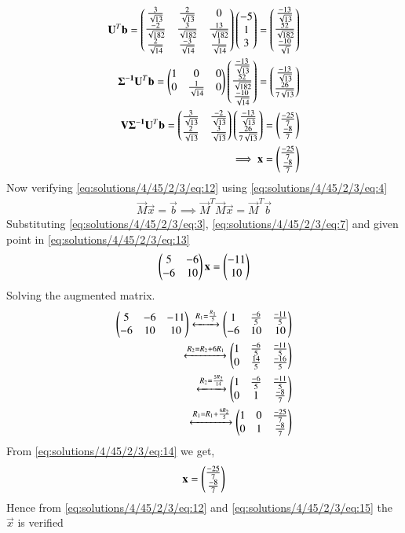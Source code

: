 \begin{align}
\mathbf{U}^T\mathbf{b}=\begin{pmatrix}\frac{3}{\sqrt{13}}&\frac{2}{\sqrt{13}}&0\\\frac{-2}{\sqrt{182}}&\frac{3}{\sqrt{182}}&\frac{13}{\sqrt{182}}\\\frac{2}{\sqrt{14}}&\frac{-3}{\sqrt{14}}&\frac{1}{\sqrt{14}}\end{pmatrix}\begin{pmatrix}-5\\1\\3\end{pmatrix} = \begin{pmatrix}\frac{-13}{\sqrt{13}}\\\frac{52}{\sqrt{182}}\\\frac{-10}{\sqrt{1}}\end{pmatrix}\\
\mathbf{\Sigma^{-1}}\mathbf{U}^T\mathbf{b}=\begin{pmatrix}1&0&0\\0&\frac{1}{\sqrt{14}}&0\end{pmatrix}\begin{pmatrix}\frac{-13}{\sqrt{13}}\\\frac{52}{\sqrt{182}}\\\frac{-10}{\sqrt{14}}\end{pmatrix}=\begin{pmatrix}\frac{-13}{\sqrt{13}}\\\frac{26}{7\sqrt{13}}\end{pmatrix}\\
\mathbf{V}\mathbf{\Sigma^{-1}}\mathbf{U}^T\mathbf{b}=\begin{pmatrix}\frac{3}{\sqrt{13}}&\frac{-2}{\sqrt{13}}\\\frac{2}{\sqrt{13}}&\frac{3}{\sqrt{13}}\end{pmatrix}\begin{pmatrix}\frac{-13}{\sqrt{13}}\\\frac{26}{7\sqrt{13}}\end{pmatrix}=\begin{pmatrix}\frac{-25}{7}\\\frac{-8}{7}\end{pmatrix}\\
\implies\mathbf{x}=\begin{pmatrix}\frac{-25}{7}\\\frac{-8}{7}\end{pmatrix}\label{eq:solutions/4/45/2/3/eq:12}
\end{align}
Now verifying \eqref{eq:solutions/4/45/2/3/eq:12} using \eqref{eq:solutions/4/45/2/3/eq:4}
\begin{align}
\vec{M}\vec{x}=\vec{b}
\implies\vec{M}^T\vec{M}\vec{x} = \vec{M}^T\vec{b}\label{eq:solutions/4/45/2/3/eq:13}
\end{align}
Substituting \eqref{eq:solutions/4/45/2/3/eq:3}, \eqref{eq:solutions/4/45/2/3/eq:7} and given point in \eqref{eq:solutions/4/45/2/3/eq:13}
\begin{align}
\begin{pmatrix}5&-6\\-6&10\end{pmatrix}\mathbf{x} = \begin{pmatrix}-11\\10\end{pmatrix}\\
\end{align}
Solving the augmented matrix.
\begin{align}
\begin{pmatrix}5&-6&-11\\-6&10&10\end{pmatrix}\xleftrightarrow{R_1=\frac{R_1}{5}}\begin{pmatrix}1&\frac{-6}{5}&\frac{-11}{5}\\-6&10&10\end{pmatrix}\\
\xleftrightarrow{R_2=R_2+6R_1}\begin{pmatrix}1&\frac{-6}{5}&\frac{-11}{5}\\0&\frac{14}{5}&\frac{-16}{5}\end{pmatrix}\\
\xleftrightarrow{R_2=\frac{5R_2}{14}}\begin{pmatrix}1&\frac{-6}{5}&\frac{-11}{5}\\0&1&\frac{-8}{7}\end{pmatrix}\\
\xleftrightarrow{R_1=R_1+\frac{6R_2}{5}}\begin{pmatrix}1&0&\frac{-25}{7}\\0&1&\frac{-8}{7}\end{pmatrix}\label{eq:solutions/4/45/2/3/eq:14}
\end{align}
From \eqref{eq:solutions/4/45/2/3/eq:14} we get,
\begin{align}
\mathbf{x}=\begin{pmatrix}\frac{-25}{7}\\\frac{-8}{7}\end{pmatrix}\label{eq:solutions/4/45/2/3/eq:15}
\end{align}
Hence from \eqref{eq:solutions/4/45/2/3/eq:12} and \eqref{eq:solutions/4/45/2/3/eq:15} the $\vec{x}$ is verified
